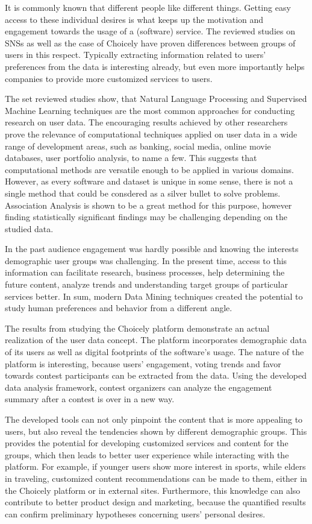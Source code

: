It is commonly known that different people like different things. Getting easy access to these individual desires is what keeps up the motivation and engagement towards the usage of a (software) service. The reviewed studies on SNSs as well as the case of Choicely have proven differences between groups of users in this respect. Typically extracting information related to users' preferences from the data is interesting already, but even more importantly helps companies to provide more customized services to users. 

The set reviewed studies show, that Natural Language Processing and Supervised Machine Learning techniques are the most common approaches for conducting research on user data. The encouraging results achieved by other researchers prove the relevance of computational techniques applied on user data in a wide range of development areas, such as banking, social media, online movie databases, user portfolio analysis, to name a few. This suggests that computational methods are versatile enough to be applied in various domains. However, as every software and dataset is unique in some sense, there is not a single method that could be consdered as a silver bullet to solve problems. Association Analysis is shown to be a great method for this purpose, however finding statistically significant findings may be challenging depending on the studied data.

In the past audience engagement was hardly possible and knowing the interests demographic user groups was challenging. In the present time, access to this information can facilitate research, business processes, help determining the future content, analyze trends and understanding target groups of particular services better. In sum, modern Data Mining techniques created the potential to study human preferences and behavior from a different angle.

The results from studying the Choicely platform demonstrate an actual realization of the user data concept. The platform incorporates demographic data of its users as well as digital footprints of the software's usage. The nature of the platform is interesting, because users' engagement, voting trends and favor towards contest participants can be extracted from the data. Using the developed data analysis framework, contest organizers can analyze the engagement summary after a contest is over in a new way. 

The developed tools can not only pinpoint the content that is more appealing to users, but also reveal the tendencies shown by different demographic groups. This provides the potential for developing customized services and content for the groups, which then leads to better user experience while interacting with the platform. For example, if younger users show more interest in sports, while elders in traveling, customized content recommendations can be made to them, either in the Choicely platform or in external sites. Furthermore, this knowledge can also contribute to better product design and marketing, because the quantified results can confirm preliminary hypotheses concerning users' personal desires. 

